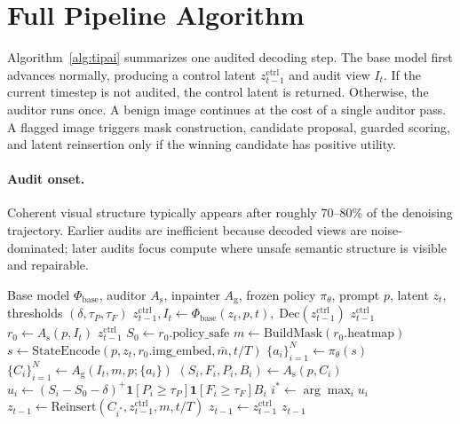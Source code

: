 \documentclass[11pt]{article}
\newcommand{\As}{A_{\mathrm{s}}}
\newcommand{\Ag}{A_{\mathrm{g}}}
\begin{document}
\section{Full Pipeline Algorithm}
\label{sec:algorithm}

Algorithm~\ref{alg:tipai} summarizes one audited decoding step. The base model
first advances normally, producing a control latent
$z^{\mathrm{ctrl}}_{t-1}$ and audit view $I_t$. If the current timestep is not
audited, the control latent is returned. Otherwise, the auditor runs once. A
benign image continues at the cost of a single auditor pass. A flagged image
triggers mask construction, candidate proposal, guarded scoring, and latent
reinsertion only if the winning candidate has positive utility.

\paragraph{Audit onset.}
Coherent visual structure typically appears after roughly 70--80\% of the
denoising trajectory. Earlier audits are inefficient because decoded views are
noise-dominated; later audits focus compute where unsafe semantic structure is
visible and repairable.

\begin{algorithm}[h]
\small
\caption{\textsc{GuardPaint} Decoding Step at Timestep $t$}
\label{alg:tipai}
\begin{algorithmic}[1]
\Require Base model $\Phi_{\mathrm{base}}$, auditor $\As$, inpainter $\Ag$,
         frozen policy $\pi_\theta$, prompt $p$, latent $z_t$,
         thresholds $(\delta,\tau_P,\tau_F)$
\State $z_{t-1}^{\mathrm{ctrl}}, I_t \gets
       \Phi_{\mathrm{base}}(z_t,p,t),\;
       \mathrm{Dec}(z_{t-1}^{\mathrm{ctrl}})$
  \State \Return $z_{t-1}^{\mathrm{ctrl}}$
\EndIf
\State $r_0 \gets \As(p,I_t)$ 
  \State \Return $z_{t-1}^{\mathrm{ctrl}}$ 
\EndIf
\State $S_0 \gets r_0.\mathrm{policy\_safe}$
\State $m \gets \mathrm{BuildMask}(r_0.\mathrm{heatmap})$
\State $s \gets \mathrm{StateEncode}(p,z_t,r_0.\mathrm{img\_embed},\bar m,t/T)$
\State $\{a_i\}_{i=1}^{N} \gets \pi_\theta(s)$
\State $\{C_i\}_{i=1}^{N} \gets \Ag(I_t,m,p;\{a_i\})$
  \State $(S_i,F_i,P_i,B_i) \gets \As(p,C_i)$
  \State $u_i \gets (S_i-S_0-\delta)^+
      \mathbf{1}[P_i\ge\tau_P]\mathbf{1}[F_i\ge\tau_F]B_i$
\EndFor
\State $i^* \gets \arg\max_i u_i$
  \State $z_{t-1} \gets
  \mathrm{Reinsert}(C_{i^*},z_{t-1}^{\mathrm{ctrl}},m,t/T)$
\Else
  \State $z_{t-1} \gets z_{t-1}^{\mathrm{ctrl}}$
\EndIf
\State \Return $z_{t-1}$
\end{algorithmic}
\end{algorithm}
\end{document}
